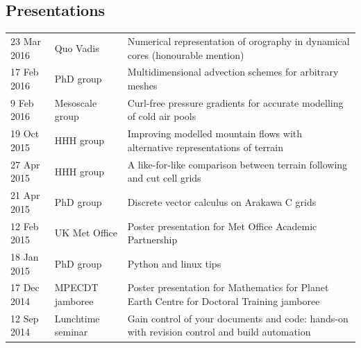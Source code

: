 \documentclass[a4paper,11pt]{article}
\begin{document}
\subsection*{Presentations}
\begin{tabularx}{\linewidth}{l l X}
23 Mar 2016 & Quo Vadis & Numerical representation of orography in dynamical cores (honourable mention) \\
17 Feb 2016 & PhD group & Multidimensional advection schemes for arbitrary meshes \\
9 Feb 2016 & Mesoscale group & Curl-free pressure gradients for accurate modelling of cold air pools \\
19 Oct 2015 & HHH group & Improving modelled mountain flows with alternative representations of terrain \\
27 Apr 2015 & HHH group & A like-for-like comparison between terrain following and cut cell grids \\
21 Apr 2015 & PhD group & Discrete vector calculus on Arakawa C grids \\
12 Feb 2015 & UK Met Office & Poster presentation for Met Office Academic Partnership \\
18 Jan 2015 & PhD group & Python and linux tips \\
17 Dec 2014 & MPECDT jamboree & Poster presentation for Mathematics for Planet Earth Centre for Doctoral Training jamboree \\
12 Sep 2014 & Lunchtime seminar  & Gain control of your documents and code: hands-on with revision control and build automation \\
\end{tabularx}
\end{document}
